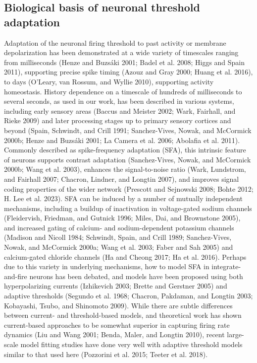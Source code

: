 \documentclass[pdflatex,referee,iicol,sn-basic]{sn-jnl}
\begin{document}
\subsection{Biological basis of neuronal threshold adaptation}

Adaptation of the neuronal firing threshold to past activity or membrane depolarization has been demonstrated at a wide variety of timescales ranging from milliseconds (Henze and Buzsáki 2001; Badel et al. 2008; Higgs and Spain 2011), supporting precise spike timing (Azouz and Gray 2000; Huang et al. 2016), to days (O’Leary, van Rossum, and Wyllie 2010), supporting activity homeostasis. History dependence on a timescale of hundreds of milliseconds to several seconds, as used in our work, has been described in various systems, including early sensory areas (Baccus and Meister 2002; Wark, Fairhall, and Rieke 2009) and later processing stages up to primary sensory cortices and beyond (Spain, Schwindt, and Crill 1991; Sanchez-Vives, Nowak, and McCormick 2000b; Henze and Buzsáki 2001; La Camera et al. 2006; Abolafia et al. 2011). Commonly described as spike-frequency adaptation (SFA), this intrinsic feature of neurons supports contrast adaptation (Sanchez-Vives, Nowak, and McCormick 2000b; Wang et al. 2003), enhances the signal-to-noise ratio (Wark, Lundstrom, and Fairhall 2007; Chacron, Lindner, and Longtin 2007), and improves signal coding properties of the wider network (Prescott and Sejnowski 2008; Bohte 2012; H. Lee et al. 2023). SFA can be induced by a number of mutually independent mechanisms, including a buildup of inactivation in voltage-gated sodium channels (Fleidervish, Friedman, and Gutnick 1996; Miles, Dai, and Brownstone 2005), and increased gating of calcium- and sodium-dependent potassium channels (Madison and Nicoll 1984; Schwindt, Spain, and Crill 1989; Sanchez-Vives, Nowak, and McCormick 2000a; Wang et al. 2003; Faber and Sah 2005) and calcium-gated chloride channels (Ha and Cheong 2017; Ha et al. 2016). Perhaps due to this variety in underlying mechanisms, how to model SFA in integrate-and-fire neurons has been debated, and models have been proposed using both hyperpolarizing currents (Izhikevich 2003; Brette and Gerstner 2005) and adaptive thresholds (Segundo et al. 1968; Chacron, Pakdaman, and Longtin 2003; Kobayashi, Tsubo, and Shinomoto 2009). While there are subtle differences between current- and threshold-based models, and theoretical work has shown current-based approaches to be somewhat superior in capturing firing rate dynamics (Liu and Wang 2001; Benda, Maler, and Longtin 2010), recent large-scale model fitting studies have done very well with adaptive threshold models similar to that used here (Pozzorini et al. 2015; Teeter et al. 2018).
\end{document}
